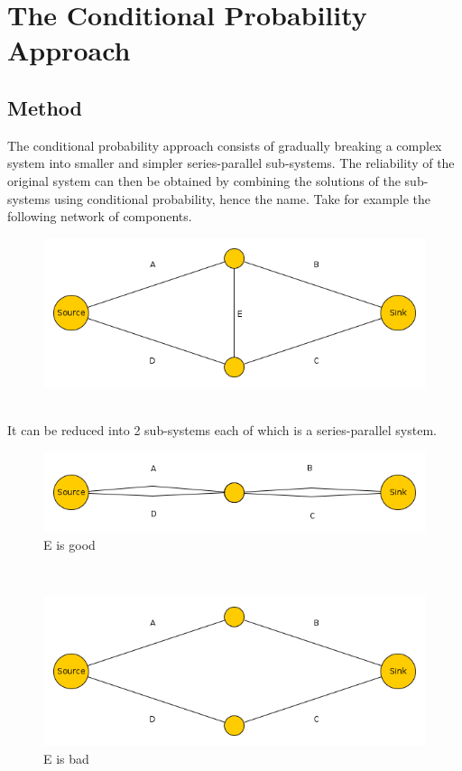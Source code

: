\documentclass[conference]{IEEEtran}
\begin{document}
\section{The Conditional Probability Approach}
\subsection{Method}
The conditional probability approach consists of gradually breaking a complex
system into smaller and simpler series-parallel sub-systems. The reliability of
the original system can then be obtained by combining the solutions of the
sub-systems using conditional probability, hence the name. Take for example the
following network of components.\\
\begin{figure}[h]
  \includegraphics[scale=0.5]{demo_sys_1}
  \label{fig:sys1}
\end{figure}
\\
It can be reduced into 2 sub-systems each of which is a series-parallel system.\\
\begin{figure}[h]
  \includegraphics[scale=0.5]{demo_sys_1_e_good}
  \caption{E is good}
  \label{fig:egood}
\end{figure}
\\
\begin{figure}[h]
  \includegraphics[scale=0.5]{demo_sys_1_e_bad}
  \caption{E is bad}
  \label{fig:ebad}
\end{figure}
\end{document}
